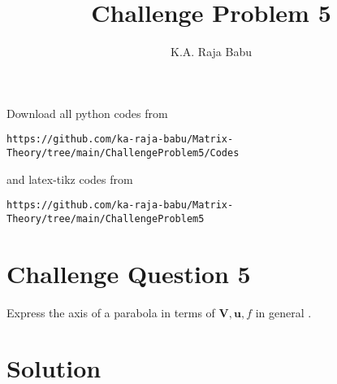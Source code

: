 \documentclass[journal,12pt,twocolumn]{IEEEtran}
\begin{document}
\makeatother
\let\StandardTheFigure\thefigure
\let\vec\mathbf
\renewcommand{\thefigure}{\theproblem}
\def\putbox#1#2#3{\makebox[0in][l]{\makebox[#1][l]{}\raisebox{\baselineskip}[0in][0in]{\raisebox{#2}[0in][0in]{#3}}}}
     \def\rightbox#1{\makebox[0in][r]{#1}}
     \def\centbox#1{\makebox[0in]{#1}}
     \def\topbox#1{\raisebox{-\baselineskip}[0in][0in]{#1}}
     \def\midbox#1{\raisebox{-0.5\baselineskip}[0in][0in]{#1}}
\vspace{3cm}
\title{Challenge Problem 5}
\author{K.A. Raja Babu}
\maketitle
\newpage
\bigskip
\renewcommand{\thefigure}{\theenumi}
\renewcommand{\thetable}{\theenumi}
Download all python codes from 
\begin{lstlisting}
https://github.com/ka-raja-babu/Matrix-Theory/tree/main/ChallengeProblem5/Codes
\end{lstlisting}
%
and latex-tikz codes from 
%
\begin{lstlisting}
https://github.com/ka-raja-babu/Matrix-Theory/tree/main/ChallengeProblem5
\end{lstlisting}
%
\section{Challenge Question 5}

Express the axis of a parabola in terms of $\vec{V},\vec{u},f$ in general .

\section{Solution}
\end{document}
